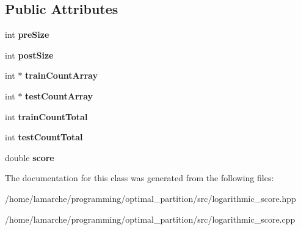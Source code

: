 \subsection*{Public Attributes}
\begin{DoxyCompactItemize}
\item 
\hypertarget{classLogarithmicObjectiveValue_a7b07978deeb0561308efe6bb6a1fd147}{int {\bfseries pre\-Size}}\label{classLogarithmicObjectiveValue_a7b07978deeb0561308efe6bb6a1fd147}

\item 
\hypertarget{classLogarithmicObjectiveValue_aae8e9b82f87468f993b416963fd6c331}{int {\bfseries post\-Size}}\label{classLogarithmicObjectiveValue_aae8e9b82f87468f993b416963fd6c331}

\item 
\hypertarget{classLogarithmicObjectiveValue_a61ff90cabef125963b0da5269c399ee0}{int $\ast$ {\bfseries train\-Count\-Array}}\label{classLogarithmicObjectiveValue_a61ff90cabef125963b0da5269c399ee0}

\item 
\hypertarget{classLogarithmicObjectiveValue_abc923915667f666ce43c9445918d9fa2}{int $\ast$ {\bfseries test\-Count\-Array}}\label{classLogarithmicObjectiveValue_abc923915667f666ce43c9445918d9fa2}

\item 
\hypertarget{classLogarithmicObjectiveValue_ad266163948c5d52072e85f5b0e600881}{int {\bfseries train\-Count\-Total}}\label{classLogarithmicObjectiveValue_ad266163948c5d52072e85f5b0e600881}

\item 
\hypertarget{classLogarithmicObjectiveValue_aa3dcc1ceefeb2e7ba2b547af086ef1a5}{int {\bfseries test\-Count\-Total}}\label{classLogarithmicObjectiveValue_aa3dcc1ceefeb2e7ba2b547af086ef1a5}

\item 
\hypertarget{classLogarithmicObjectiveValue_a1b6e9daa97f490e6da4a06e6dc813ba5}{double {\bfseries score}}\label{classLogarithmicObjectiveValue_a1b6e9daa97f490e6da4a06e6dc813ba5}

\end{DoxyCompactItemize}


The documentation for this class was generated from the following files\-:\begin{DoxyCompactItemize}
\item 
/home/lamarche/programming/optimal\-\_\-partition/src/logarithmic\-\_\-score.\-hpp\item 
/home/lamarche/programming/optimal\-\_\-partition/src/logarithmic\-\_\-score.\-cpp\end{DoxyCompactItemize}
